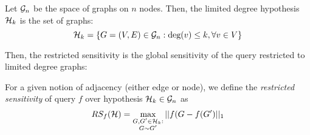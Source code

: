  \begin{definition}
 Let $\mathcal{G}_n$ be the space of graphs on $n$ nodes. Then, the limited degree hypothesis $\mathcal{H}_k$ is the set of graphs:
 $$\mathcal{H}_k = \{G = (V,E) \in \mathcal{G}_n : \text{deg}(v) \leq k, \forall v \in V \}$$
 \end{definition}
 
 Then, the restricted sensitivity is the global sensitivity of the query restricted to limited degree graphs:

\begin{definition}
\label{def:restricted-sensitivity}
For a given notion of adjacency (either edge or node), we define the \emph{restricted sensitivity} of query $f$ over hypothesis $\mathcal{H}_k \in \mathcal{G}_n$ as
$$RS_f(\mathcal{H}) =\max_{\substack{G, G'\in \mathcal{H}_k:\\ G\sim G'}} ||f(G - f(G')||_1$$
\end{definition}




